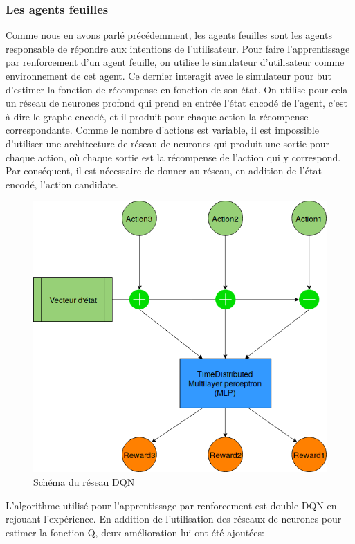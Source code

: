 \subsubsection*{Les agents feuilles}
Comme nous en avons parlé précédemment, les agents feuilles sont les agents responsable de répondre aux intentions de l'utilisateur. Pour faire l'apprentissage par renforcement d'un agent feuille, on utilise le simulateur d'utilisateur comme environnement de cet agent. Ce dernier interagit avec le simulateur pour but d'estimer la fonction de récompense en fonction de son état. On utilise pour cela un réseau de neurones profond qui prend en entrée l'état encodé de l'agent, c'est à dire le graphe encodé, et il produit pour chaque action la récompense correspondante. Comme le nombre d'actions est variable, il est impossible d'utiliser une architecture de réseau de neurones qui produit une sortie pour chaque action, où chaque sortie est la récompense de l'action qui y correspond. Par conséquent, il est nécessaire de donner au réseau, en addition de l'état encodé, l'action candidate.
\begin{figure}[H] 
	\centering
	\includegraphics[width=0.5\linewidth]{images/Conception/DM/time_dist.png}
	\caption{Schéma du réseau DQN}
\end{figure}\label{time_dist}
L'algorithme utilisé pour l'apprentissage par renforcement est double DQN en rejouant l'expérience. En addition de l'utilisation des réseaux de neurones pour estimer la fonction Q, deux amélioration lui ont été ajoutées:
